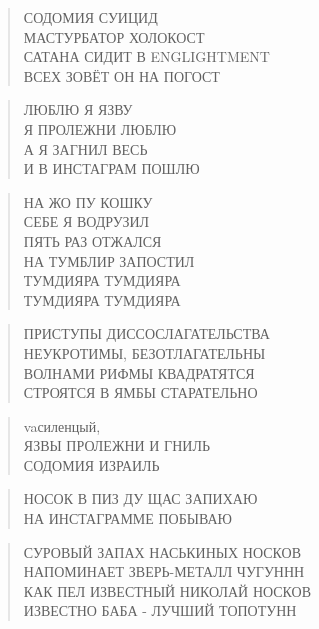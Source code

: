 \poemtitle{***}
\begin{verse}
СОДОМИЯ СУИЦИД\\
МАСТУРБАТОР ХОЛОКОСТ\\
САТАНА СИДИТ В ENGLIGHTMENT\\
ВСЕХ ЗОВЁТ ОН НА ПОГОСТ
\end{verse}

\poemtitle{***}
\begin{verse}
ЛЮБЛЮ Я ЯЗВУ\\
Я ПРОЛЕЖНИ ЛЮБЛЮ\\
А Я ЗАГНИЛ ВЕСЬ\\
И В ИНСТАГРАМ ПОШЛЮ
\end{verse}

\poemtitle{***}
\begin{verse}
НА ЖО ПУ КОШКУ\\
СЕБЕ Я ВОДРУЗИЛ\\
ПЯТЬ РАЗ ОТЖАЛСЯ\\
НА ТУМБЛИР ЗАПОСТИЛ\\
ТУМДИЯРА ТУМДИЯРА \\
ТУМДИЯРА ТУМДИЯРА
\end{verse}

\poemtitle{***}
\begin{verse}
ПРИСТУПЫ ДИССОСЛАГАТЕЛЬСТВА\\
НЕУКРОТИМЫ, БЕЗОТЛАГАТЕЛЬНЫ\\
ВОЛНАМИ РИФМЫ КВАДРАТЯТСЯ\\
СТРОЯТСЯ В ЯМБЫ СТАРАТЕЛЬНО
\end{verse}

\poemtitle{***}
\begin{verse}
vaсиленцый, \\
ЯЗВЫ ПРОЛЕЖНИ И ГНИЛЬ\\
СОДОМИЯ ИЗРАИЛЬ
\end{verse}

\poemtitle{***}
\begin{verse}
НОСОК В ПИЗ ДУ ЩАС ЗАПИХАЮ \\
НА ИНСТАГРАММЕ ПОБЫВАЮ
\end{verse}

\poemtitle{***}
\begin{verse}
СУРОВЫЙ ЗАПАХ НАСЬКИНЫХ НОСКОВ\\
НАПОМИНАЕТ ЗВЕРЬ-МЕТАЛЛ ЧУГУННН\\
КАК ПЕЛ ИЗВЕСТНЫЙ НИКОЛАЙ НОСКОВ\\
ИЗВЕСТНО БАБА - ЛУЧШИЙ ТОПОТУНН
\end{verse}

